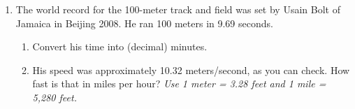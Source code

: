 \documentclass[12pt]{article}
\begin{document}
\begin{enumerate}
\newpage

\item The world record for the 100-meter track and field was set by Usain Bolt of Jamaica in Beijing 2008.  He ran 100 meters in 9.69 seconds.

\begin{enumerate}
\item Convert his time into (decimal) minutes.
\vfill
\vfill
\item His speed was approximately 10.32 meters/second, as you can check.  How fast is that in miles per hour?  \emph{Use 1 meter = 3.28 feet and 1 mile = 5,280 feet.}
\vfill
\vfill
\vfill
\end{enumerate}

\end{enumerate}
\end{document}
